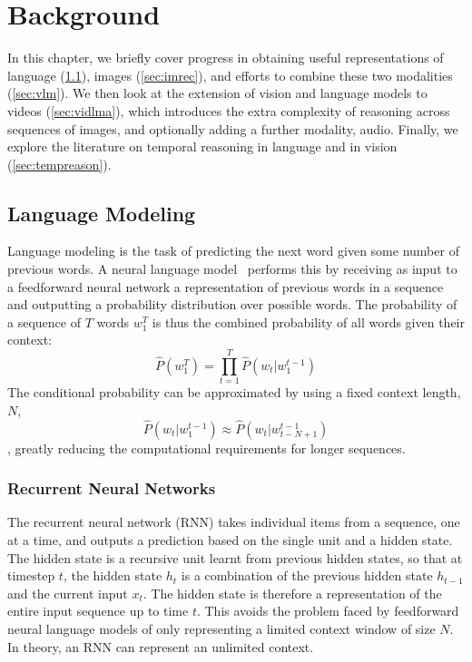 
\chapter{Background}
\label{chap:bg}

In this chapter, we briefly cover progress in obtaining useful representations
of language (\cref{sec:lm}), images (\cref{sec:imrec}), and efforts to combine
these two modalities (\cref{sec:vlm}). We then look at the extension of vision
and language models to videos (\cref{sec:vidlma}), which introduces the extra
complexity of reasoning across sequences of images, and optionally adding a
further modality, audio. Finally, we explore the literature on temporal
reasoning in language and in vision (\cref{sec:tempreason}).

\section{Language Modeling}
\label{sec:lm}

Language modeling is the task of predicting the next word given some number of
previous words. A neural language model~\citep{bengio2003nlm} performs this by
receiving as input to a feedforward neural network a representation of previous
words in a sequence and outputting a probability distribution over possible
words. The probability of a sequence of $T$ words $w_1^T$ is thus the
combined probability of all words given their context:
$$\hat{P}(w_1^T)=\prod_{t=1}^{T}\hat{P}(w_t|w_1^{t-1})$$
The conditional probability can be approximated by using a fixed context
length, $N$, $$\hat{P}(w_t|w_1^{t-1})\approx\hat{P}(w_t|w_{t-N+1}^{t-1})$$,
greatly reducing the computational requirements for longer sequences.

\subsection{Recurrent Neural Networks}
\label{ssec:rnn}

The recurrent neural network (RNN) takes individual items from a sequence, one
at a time, and outputs a prediction based on the single unit and a hidden
state.  The hidden state is a recursive unit learnt from previous hidden
states, so that at timestep $t$, the hidden state $h_t$ is a combination of the
previous hidden state $h_{t-1}$ and the current input $x_t$. The hidden state
is therefore a representation of the entire input sequence up to time $t$. This
avoids the problem faced by feedforward neural language models of only
representing a limited context window of size $N$. In theory, an RNN can
represent an unlimited context.

